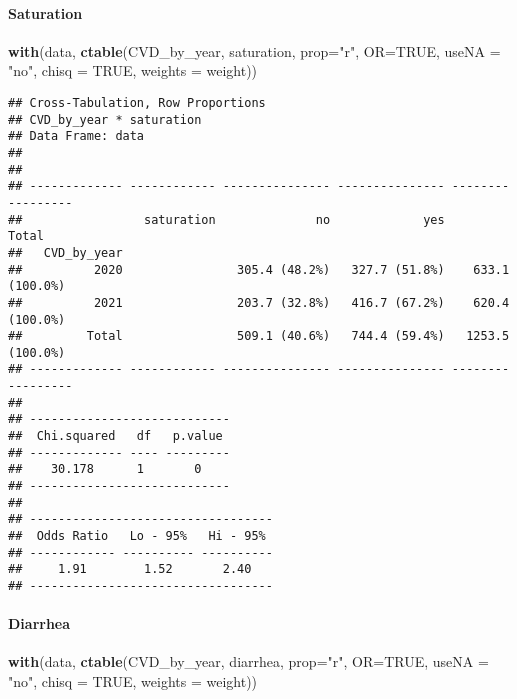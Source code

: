 \documentclass[
]{article}
\newenvironment{Shaded}{\begin{snugshade}}{\end{snugshade}}
\newcommand{\AttributeTok}[1]{\textcolor[rgb]{0.13,0.29,0.53}{#1}}
\newcommand{\ConstantTok}[1]{\textcolor[rgb]{0.56,0.35,0.01}{#1}}
\newcommand{\FunctionTok}[1]{\textcolor[rgb]{0.13,0.29,0.53}{\textbf{#1}}}
\newcommand{\NormalTok}[1]{#1}
\newcommand{\StringTok}[1]{\textcolor[rgb]{0.31,0.60,0.02}{#1}}
\begin{document}
\hypertarget{saturation-1}{%
\paragraph{\texorpdfstring{{ Saturation
}}{ Saturation }}\label{saturation-1}}

\begin{Shaded}
\begin{Highlighting}[]
\FunctionTok{with}\NormalTok{(data, }\FunctionTok{ctable}\NormalTok{(CVD\_by\_year, saturation, }\AttributeTok{prop=}\StringTok{"r"}\NormalTok{, }\AttributeTok{OR=}\ConstantTok{TRUE}\NormalTok{, }\AttributeTok{useNA =} \StringTok{"no"}\NormalTok{, }\AttributeTok{chisq =} \ConstantTok{TRUE}\NormalTok{, }\AttributeTok{weights =}\NormalTok{ weight))}
\end{Highlighting}
\end{Shaded}

\begin{verbatim}
## Cross-Tabulation, Row Proportions  
## CVD_by_year * saturation  
## Data Frame: data  
## 
## 
## ------------- ------------ --------------- --------------- -----------------
##                 saturation              no             yes             Total
##   CVD_by_year                                                               
##          2020                305.4 (48.2%)   327.7 (51.8%)    633.1 (100.0%)
##          2021                203.7 (32.8%)   416.7 (67.2%)    620.4 (100.0%)
##         Total                509.1 (40.6%)   744.4 (59.4%)   1253.5 (100.0%)
## ------------- ------------ --------------- --------------- -----------------
## 
## ----------------------------
##  Chi.squared   df   p.value 
## ------------- ---- ---------
##    30.178      1       0    
## ----------------------------
## 
## ----------------------------------
##  Odds Ratio   Lo - 95%   Hi - 95% 
## ------------ ---------- ----------
##     1.91        1.52       2.40   
## ----------------------------------
\end{verbatim}

\hypertarget{diarrhea-1}{%
\paragraph{\texorpdfstring{{ Diarrhea }}{ Diarrhea }}\label{diarrhea-1}}

\begin{Shaded}
\begin{Highlighting}[]
\FunctionTok{with}\NormalTok{(data, }\FunctionTok{ctable}\NormalTok{(CVD\_by\_year, diarrhea, }\AttributeTok{prop=}\StringTok{"r"}\NormalTok{, }\AttributeTok{OR=}\ConstantTok{TRUE}\NormalTok{, }\AttributeTok{useNA =} \StringTok{"no"}\NormalTok{, }\AttributeTok{chisq =} \ConstantTok{TRUE}\NormalTok{, }\AttributeTok{weights =}\NormalTok{ weight))}
\end{Highlighting}
\end{Shaded}
\end{document}
